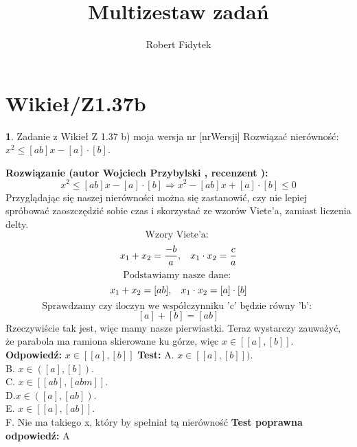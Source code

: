 \documentclass[12pt, a4paper]{article}
\title{Multizestaw zadań}
\author{Robert Fidytek}
\date{}
\theoremstyle{definition} %
\newtheorem{zad}{}
\newcommand{\kategoria}[1]{\section{#1}} %
\newcommand{\zadStart}[1]{\begin{zad}#1\newline} %
\newcommand{\zadStop}{\end{zad}}   %
\newcommand{\rozwStart}[2]{\noindent \textbf{Rozwiązanie (autor #1 , recenzent #2): }\newline} %
\newcommand{\rozwStop}{\newline}                                            %
\newcommand{\odpStart}{\noindent \textbf{Odpowiedź:}\newline}    %
\newcommand{\odpStop}{\newline}                                             %
\newcommand{\testStart}{\noindent \textbf{Test:}\newline} %
\newcommand{\testStop}{\newline} %
\newcommand{\kluczStart}{\noindent \textbf{Test poprawna odpowiedź:}\newline} %
\newcommand{\kluczStop}{\newline} %
\begin{document}
\maketitle


\kategoria{Wikieł/Z1.37b}
\zadStart{Zadanie z Wikieł Z 1.37 b) moja wersja nr [nrWersji]}
Rozwiązać nierówność: $x^{2}\leq[ab]x-[a]\cdot[b]$.
\zadStop
\rozwStart{Wojciech Przybylski}{}
$$x^{2}\leq[ab]x-[a]\cdot[b]\Rightarrow x^{2}-[ab]x+[a]\cdot[b]\leq0$$
Przyglądając się naszej nierówności można się zastanowić, czy nie lepiej spróbować zaoszczędzić sobie czas i skorzystać ze wzorów Viete'a, zamiast liczenia delty.
$$\mbox{Wzory Viete'a: }$$
$$ x_{1}+x_{2}=\frac{-b}{a},\hspace{3mm} x_{1}\cdot x_{2}=\frac{c}{a}$$
$$\mbox{Podstawiamy nasze dane: }$$
$$  x_{1}+x_{2}=[ab],\hspace{3mm}x_{1}\cdot x_{2}=[a]\cdot[b]$$
$$\mbox{Sprawdzamy czy iloczyn we współczynniku 'c' będzie równy 'b': }$$
$$ [a]+[b]=[ab]$$
Rzeczywiście tak jest, więc mamy nasze pierwiastki. Teraz wystarczy zauważyć, że parabola ma ramiona skierowane ku górze, więc $x\in[[a],[b]]$.
\rozwStop
\odpStart
$x\in[[a],[b]]$
\odpStop
\testStart
A. $x\in[[a],[b]])$.\\
B. $x\in([a],[b])$.\\
C. $x\in[[ab],[abm]]$.\\
D.$x\in([a],[ab])$.\\
E. $x\in[[a],[ab]]$.\\
F. Nie ma takiego x, który by spełniał tą nierówność
\testStop
\kluczStart
A
\kluczStop
\end{document}
